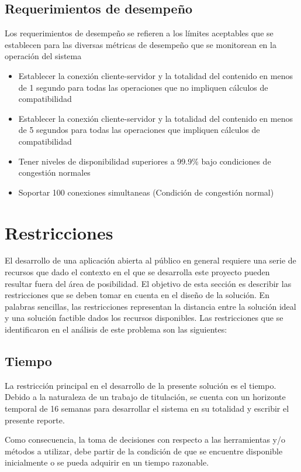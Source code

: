 \subsection{Requerimientos de desempeño}
Los requerimientos de desempeño se refieren a los límites aceptables que se establecen para las diversas métricas de desempeño que se monitorean en la operación del sistema
\begin{itemize}
  El sistema debe alcanzar los siguientes parámetros de desempeño para considerar que cumple con los objetivos planteados:
    \item Establecer la conexión cliente-servidor y la totalidad del contenido en menos de 1 segundo para todas las operaciones que no impliquen cálculos de compatibilidad
    \item Establecer la conexión cliente-servidor y la totalidad del contenido en menos de 5 segundos para todas las operaciones que impliquen cálculos de compatibilidad
    \item Tener niveles de disponibilidad superiores a 99.9\% bajo condiciones de congestión normales
    \item Soportar 100 conexiones simultaneas (Condición de congestión normal)
\end{itemize}

\section{Restricciones}
El desarrollo de una aplicación abierta al público en general requiere una serie de recursos que dado el contexto en el que se desarrolla este proyecto pueden resultar fuera del área de posibilidad. El objetivo de esta sección es describir las restricciones que se deben tomar en cuenta en el diseño de la solución. En palabras sencillas, las restricciones representan la distancia entre la solución ideal y una solución factible dados los recursos disponibles.
Las restricciones que se identificaron en el análisis de este problema son las siguientes:

\subsection{Tiempo}
La restricción principal en el desarrollo de la presente solución es el tiempo. Debido a la naturaleza de un trabajo de titulación, se cuenta con un horizonte temporal de 16 semanas para desarrollar el sistema en su totalidad y escribir el presente reporte. 

Como consecuencia, la toma de decisiones con respecto a las herramientas y/o métodos a utilizar, debe partir de la condición de que se encuentre disponible inicialmente o se pueda adquirir en un tiempo razonable. 

